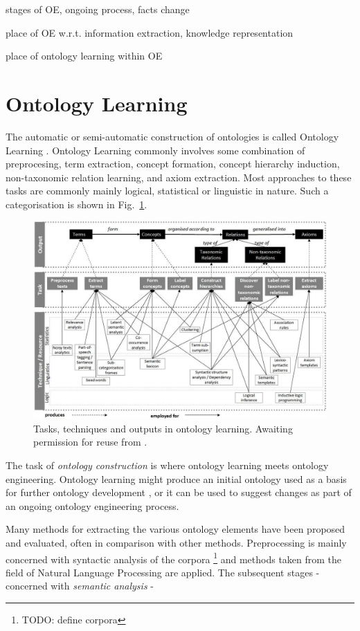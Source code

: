 \documentclass[a4paper]{report}
\newcommand{\todo}[1]{\footnote{{\color{red} TODO: #1}}}
\begin{document}
stages of OE, ongoing process, facts change

place of OE w.r.t. information extraction, knowledge representation

place of ontology learning within OE

\section{Ontology Learning}

The automatic or semi-automatic construction of ontologies is called Ontology Learning \cite{Cimiano06}.
Ontology Learning commonly involves some combination of preprocesing, term extraction, concept formation, concept hierarchy induction, non-taxonomic relation learning, and axiom extraction.
Most approaches to these tasks are commonly mainly logical, statistical or linguistic in nature\cite{Wong11Survey}.
Such a categorisation is shown in Fig.~\ref{fig:tasktechout}.
\begin{figure}
  \includegraphics[width=\textwidth]{graphics/output-task-technique-WongLiuBennamoun.png}
  \caption{Tasks, techniques and outputs in ontology learning. Awaiting permission for reuse from \cite{Wong2009PhD}.}
  \label{fig:tasktechout}
\end{figure}
The task of \emph{ontology construction} is where ontology learning meets ontology engineering.
Ontology learning might produce an initial ontology used as a basis for further ontology development \cite{Voelkner2008Spanish}, or it can be used to suggest changes as part of an ongoing ontology engineering process.

Many methods for extracting the various ontology elements have been proposed and evaluated, often in comparison with other methods.
Preprocessing is mainly concerned with syntactic analysis of the corpora \todo{define corpora} and methods taken from the field of Natural Language Processing are applied.
The subsequent stages - concerned with \emph{semantic analysis} - 
\end{document}
